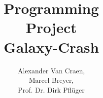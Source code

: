 \documentclass[aspectratio=169,table,x11names,dvipsnames]{beamer}
\institute[logo=.logos/ipvslogo_rund_blau_dunkel.pdf, url=https://www.ipvs.uni-stuttgart.de/]{Institute for Parallel and Distributed Systems}{IPVS}
\title{Programming\\ Project\\ Galaxy-Crash}
\author[Van Craen, Breyer, Prof. Pflüger]{Alexander Van Craen,\\Marcel Breyer,\\Prof. Dr. Dirk Pflüger}
\date{\semester}
\begin{document}
  \titleslide

  
\end{document}
